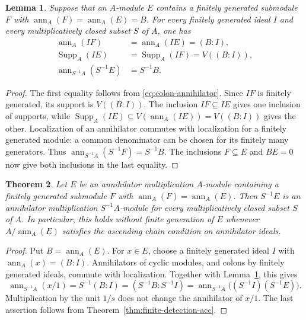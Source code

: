 \documentclass[11pt]{amsart}
\theoremstyle{plain}
\newtheorem{theorem}{Theorem}[section]
\newtheorem{lemma}[theorem]{Lemma}
\theoremstyle{definition}
\theoremstyle{remark}
\DeclareMathOperator{\Supp}{Supp}
\newcommand{\ann}{\operatorname{ann}}
\numberwithin{equation}{section}
\begin{document}
\begin{lemma}\label{lem:finite-detection-calculus}
Suppose that an $A$-module $E$ contains a finitely generated submodule
$F$ with $\ann_A(F)=\ann_A(E)=B$. For every finitely generated ideal
$I$ and every multiplicatively closed subset $S$ of $A$, one has
\[
 \begin{aligned}
 \ann_A(IF)&=\ann_A(IE)=(B:I),\\
 \Supp_A(IE)&=\Supp_A(IF)=V((B:I)),\\
 \ann_{S^{-1}A}(S^{-1}E)&=S^{-1}B.
 \end{aligned}
\]
\end{lemma}

\begin{proof}
The first equality follows from \eqref{eq:colon-annihilator}.
Since $IF$ is finitely generated, its support is $V((B:I))$.
The inclusion $IF\subseteq IE$ gives one inclusion of supports, while
$\Supp_A(IE)\subseteq V(\ann_A(IE))=V((B:I))$ gives the other.
Localization of an annihilator commutes with localization for a finitely
generated module: a common denominator can be chosen for its finitely
many generators. Thus
$\ann_{S^{-1}A}(S^{-1}F)=S^{-1}B$.
The inclusions $F\subseteq E$ and $BE=0$ now give both inclusions
in the last equality.
\end{proof}

\begin{theorem}\label{thm:localization-detection}
Let $E$ be an annihilator multiplication $A$-module containing a finitely
generated submodule $F$ with $\ann_A(F)=\ann_A(E)$.
Then $S^{-1}E$ is an annihilator multiplication $S^{-1}A$-module
for every multiplicatively closed subset $S$ of $A$.
In particular, this holds without finite generation of $E$ whenever
$A/\ann_A(E)$ satisfies the ascending chain condition on annihilator ideals.
\end{theorem}

\begin{proof}
Put $B=\ann_A(E)$. For $x\in E$, choose a finitely generated ideal
$I$ with $\ann_A(x)=(B:I)$.
Annihilators of cyclic modules, and colons by finitely generated ideals,
commute with localization. Together with
Lemma~\ref{lem:finite-detection-calculus}, this gives
\[
 \ann_{S^{-1}A}(x/1)=S^{-1}(B:I)
 =(S^{-1}B:S^{-1}I)
 =\ann_{S^{-1}A}\bigl((S^{-1}I)(S^{-1}E)\bigr).
\]
Multiplication by the unit $1/s$ does not change the annihilator of $x/1$.
The last assertion follows from Theorem~\ref{thm:finite-detection-acc}.
\end{proof}
\end{document}
